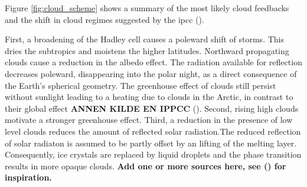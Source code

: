 Figure \ref{fig:cloud_scheme} shows a summary of the most likely cloud feedbacks and the shift in cloud regimes suggested by the \acrshort{ipcc} (\cite{IPCC_CH7_clouds}).

First, a broadening of the Hadley cell causes a poleward shift of storms. This dries the subtropics and moistens the higher latitudes. Northward propagating clouds cause a reduction in the albedo effect. The radiation available for reflection decreases poleward, disappearing into the polar night, as a direct consequence of the Earth's spherical geometry.
The greenhouse effect of clouds still persist without sunlight leading to a heating due to clouds in the Arctic, in contrast to their global effect \textbf{ANNEN KILDE EN IPPCC} (\cite{IPCC_CH7_clouds}).
Second, rising high clouds motivate a stronger greenhouse effect. Third, a reduction in the presence of low level clouds reduces the amount of reflected solar radiation.The reduced reflection of solar radiaton is assumed to be partly offset by an lifting of the melting layer. Consequently, ice crystals are replaced by liquid droplets and the phase transition results in more opaque clouds. \textbf{Add one or more sources here, see (\cite{IPCC_CH7_clouds}) for inspiration.} 
